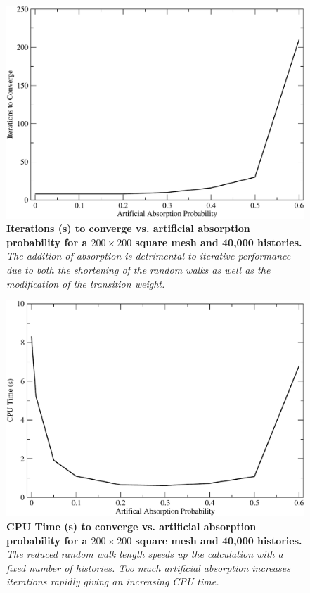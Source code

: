 \begin{figure}[p!]
  \centering
  \includegraphics[width=5in,clip]{chapters/mc_background/absorption_iters.pdf}
  \caption{\textbf{Iterations (s) to converge vs. artificial
      absorption probability for a $200 \times 200$ square mesh and
      40,000 histories.}  \textit{The addition of absorption is
      detrimental to iterative performance due to both the shortening
      of the random walks as well as the modification of the
      transition weight.}}
  \label{fig:absorption_iters}
\end{figure}

\begin{figure}[p!]
  \centering
  \includegraphics[width=5in,clip]{chapters/mc_background/absorption_time.pdf}
  \caption{\textbf{CPU Time (s) to converge vs. artificial absorption
      probability for a $200 \times 200$ square mesh and 40,000
      histories.}  \textit{The reduced random walk length speeds up
      the calculation with a fixed number of histories. Too much
      artificial absorption increases iterations rapidly giving an
      increasing CPU time.}}
  \label{fig:absorption_time}
\end{figure}
\clearpage


